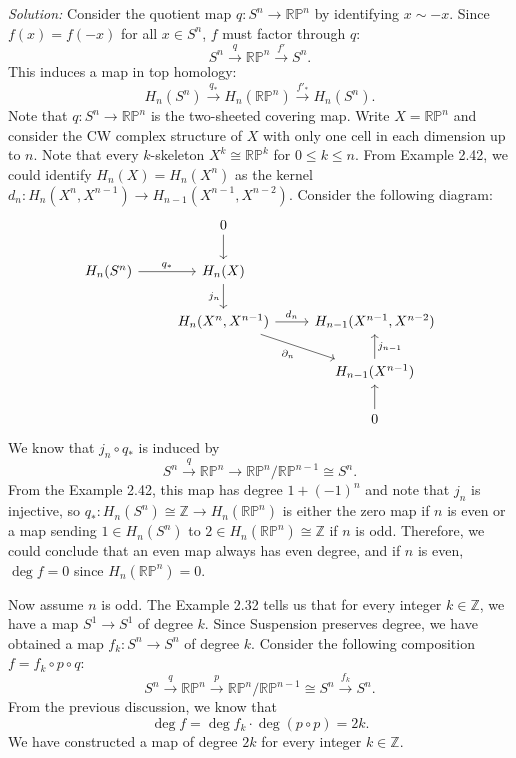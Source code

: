 \documentclass[a4paper, 12pt]{article}
\newenvironment{solution}
    {\textit{Solution:}}
    {}
\begin{document}
\begin{solution}
Consider the quotient map \(q:S^n\rightarrow \mathbb{R}\mathbb{P}^n\) by identifying \(x\sim -x\). Since \(f(x)=f(-x)\) for all \(x\in S^n\), \(f\) must factor through \(q\):
\[S^n\xrightarrow{q} \mathbb{R}\mathbb{P}^n\xrightarrow{f'}S^n.\]
This induces a map in top homology:
\[H_n(S^n)\xrightarrow{q_*} H_n(\mathbb{R}\mathbb{P}^n)\xrightarrow{f'_*}H_n(S^n).\]
Note that \(q:S^n\rightarrow \mathbb{R}\mathbb{P}^n\) is the two-sheeted covering map. Write \(X=\mathbb{R}\mathbb{P}^n\) and consider the CW complex structure of \(X\) with only one cell in each dimension up to \(n\). Note that 
every \(k\)-skeleton \(X^k\cong \mathbb{R}\mathbb{P}^k\) for \(0\leq k \leq n\). From Example 2.42, we could identify \(H_n(X)=H_n(X^n)\) as the kernel \(d_n:H_n(X^n,X^{n-1})\rightarrow H_{n-1}(X^{n-1},X^{n-2})\). Consider the following diagram:
\[\begin{tikzcd}
	& 0 \\
	{H_n(S^n)} & {H_n(X)} \\
	& {H_n(X^n,X^{n-1})} & {H_{n-1}(X^{n-1},X^{n-2})} \\
	&& {H_{n-1}(X^{n-1})} \\
	&& 0
	\arrow[from=1-2, to=2-2]
	\arrow["{q_*}", from=2-1, to=2-2]
	\arrow["{j_n}"', from=2-2, to=3-2]
	\arrow["{d_n}", from=3-2, to=3-3]
	\arrow["{\partial_n}"', from=3-2, to=4-3]
	\arrow["{j_{n-1}}"', from=4-3, to=3-3]
	\arrow[from=5-3, to=4-3]
\end{tikzcd}\]
We know that \(j_n\circ q_*\) is induced by 
\[S^n\xrightarrow{q}\mathbb{R}\mathbb{P}^n\rightarrow \mathbb{R}\mathbb{P}^n/\mathbb{R}\mathbb{P}^{n-1}\cong S^n.\]
From the Example 2.42, this map has degree \(1+(-1)^n\) and note that \(j_n\) is injective, so \(q_*:H_n(S^n)\cong \mathbb{Z}\rightarrow H_n(\mathbb{R}\mathbb{P}^n)\) is either the zero map if \(n\) is even or 
a map sending \(1\in H_n(S^n)\) to \(2\in H_n(\mathbb{R}\mathbb{P}^n)\cong \mathbb{Z}\) if \(n\) is odd. Therefore, we could conclude that an even map always has even degree, and if \(n\) is even, \(\deg f=0\) since \(H_n(\mathbb{R}\mathbb{P}^n)=0\).

Now assume \(n\) is odd. The Example 2.32 tells us that for every integer \(k\in \mathbb{Z}\), we have a map \(S^1\rightarrow S^1\) of degree \(k\). Since Suspension preserves degree, we have obtained a map \(f_k:S^n\rightarrow S^n\) of degree \(k\). Consider the following 
composition \(f=f_k\circ p\circ q\):
\[S^n\xrightarrow{q}\mathbb{R}\mathbb{P}^n\xrightarrow{p} \mathbb{R}\mathbb{P}^n/\mathbb{R}\mathbb{P}^{n-1}\cong S^n\xrightarrow{f_k}S^n.\]
From the previous discussion, we know that 
\[\deg f=\deg f_k \cdot \deg (p\circ p)=2k.\]
We have constructed a map of degree \(2k\) for every integer \(k\in \mathbb{Z}\).
\end{solution}
\end{document}
